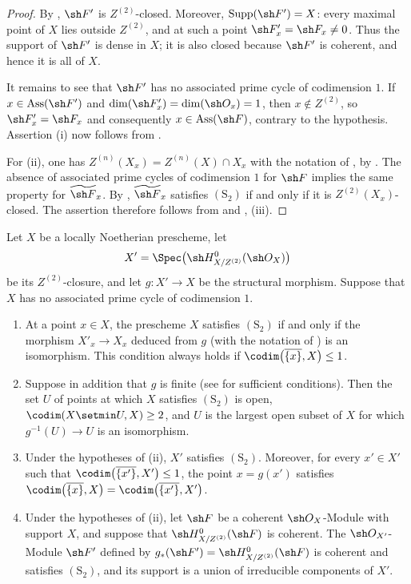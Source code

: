 \begin{proof}
By , $\sh F'$ is $Z^{(2)}$-closed.  Moreover,
$\operatorname{Supp}(\sh F')=X$: every maximal point of $X$
lies outside $Z^{(2)}$, and at such a point
$\sh F'_x=\sh F_x\neq0$.  Thus the support of $\sh F'$ is dense
in $X$; it is also closed because $\sh F'$ is coherent, and
hence it is all of $X$.

It remains to see that $\sh F'$ has no associated prime cycle of
codimension $1$.  If $x\in\operatorname{Ass}(\sh F')$ and $\dim(\sh F'_x)=\dim(\sh O_x)=1$,
then $x\notin Z^{(2)}$, so $\sh F'_x=\sh F_x$ and consequently
$x\in\operatorname{Ass}(\sh F)$, contrary to the hypothesis.
Assertion {\rm(i)} now follows from .

For {\rm(ii)}, one has $Z^{(n)}(X_x)=Z^{(n)}(X)\cap X_x$
with the notation of , by .
The absence of associated prime cycles of codimension $1$ for
$\sh F$ implies the same property for
$\widetilde{\sh F}_x$.  By ,
$\widetilde{\sh F}_x$ satisfies $(\mathrm S_2)$ if and only if
it is $Z^{(2)}(X_x)$-closed.  The assertion therefore follows
from  and , {\rm(iii)}.
\end{proof}

\begin{proposition}[5.10.16]
\label{IV.5.10.16}
Let $X$ be a locally Noetherian prescheme, let
\[
  X'=\Spec\bigl(\sh H^0_{X/Z^{(2)}}(\sh O_X)\bigr)
\]
be its $Z^{(2)}$-closure, and let $g:X'\to X$ be the structural
morphism.  Suppose that $X$ has no associated prime cycle of
codimension $1$.
\begin{enumerate}[{\rm(i)}]
  \item At a point $x\in X$, the prescheme $X$ satisfies
  $(\mathrm S_2)$ if and only if the morphism $X'_x\longrightarrow X_x$
  deduced from $g$ (with the notation of ) is
  an isomorphism.  This condition always holds if $\codim\bigl(\overline{\{x\}},X\bigr)\leq1$.
  \item Suppose in addition that $g$ is finite \textup{(see
   for} sufficient \textup{conditions)}.  Then the set
  $U$ of points at which $X$ satisfies $(\mathrm S_2)$ is open, $\codim(X\setmin U,X)\geq2$,
  and $U$ is the largest open subset of $X$ for which
  $g^{-1}(U)\to U$ is an isomorphism.
  \item Under the hypotheses of {\rm(ii)}, $X'$ satisfies
  $(\mathrm S_2)$.  Moreover, for every $x'\in X'$ such that $\codim\bigl(\overline{\{x'\}},X'\bigr)\leq1$,
  the point $x=g(x')$ satisfies $\codim\bigl(\overline{\{x\}},X\bigr)
=
\codim\bigl(\overline{\{x'\}},X'\bigr)$.
  \item Under the hypotheses of {\rm(ii)}, let $\sh F$ be a
  coherent $\sh O_X$-Module with support $X$, and suppose that
  $\sh H^0_{X/Z^{(2)}}(\sh F)$ is coherent.  The
  $\sh O_{X'}$-Module $\sh F'$ defined by $g_*(\sh F')=\sh H^0_{X/Z^{(2)}}(\sh F)$
  is coherent and satisfies $(\mathrm S_2)$, and its support is
  a union of irreducible components of $X'$.
\end{enumerate}
\end{proposition}

